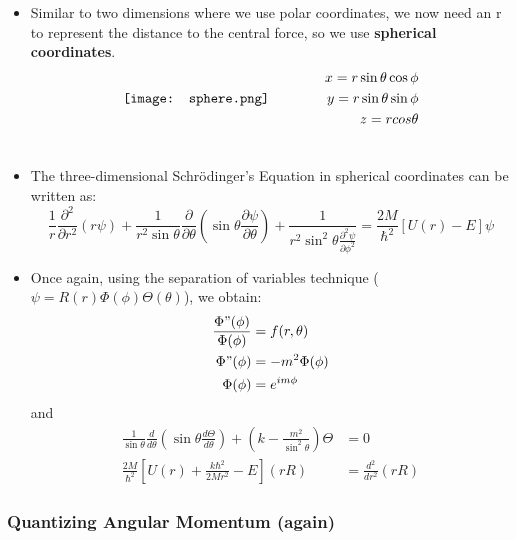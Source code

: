 \documentclass[12pt, letterpaper, twoside]{article}
\begin{document}
\begin{itemize}
    \item Similar to two dimensions where we use polar coordinates, we now need an r to represent the distance to the central force, so we use \textbf{spherical coordinates}.
    \begin{align}
        \vcenter{\hbox{\texttt{[image: sphere.png]}}}
        &\qquad\qquad
        \begin{aligned}
            x = r\sin{\theta}\cos{\phi} \\
            y = r\sin{\theta}\sin{\phi} \\
            z = rcos{\theta}
        \end{aligned}\\
        \vcenter{\hbox{\begin{minipage}{4cm}
        \end{minipage}}}
        & \notag
    \end{align}
    \item The three-dimensional Schr\"{o}dinger's Equation in spherical coordinates can be written as:
    \begin{equation}
        \frac{1}{r}\frac{\partial^2}{\partial r^2}(r\psi) + \frac{1}{r^2\sin{\theta}}\frac{\partial}{\partial\theta}(\sin{\theta}\frac{\partial\psi}{\partial\theta}) + \frac{1}{r^2\sin^2{\theta}\frac{\partial^2\psi}{\partial\phi^2}} = \frac{2M}{\hbar^2}[U(r) - E]\psi
    \end{equation}
    \item Once again, using the separation of variables technique ($\psi = R(r)\Phi(\phi)\Theta(\theta)$), we obtain:
    \begin{align*}
        \frac{\Phi"(\phi)}{\Phi(\phi)} &= f(r, \theta) \\
        \Phi"(\phi) &= -m^2\Phi(\phi) \\
        \Phi(\phi) &= e^{im\phi}
    \end{align*}
    and
    \begin{align*}
        \frac{1}{\sin\theta}\frac{d}{d\theta}(\sin\theta\frac{d\Theta}{d\theta}) + (k - \frac{m^2}{\sin^2\theta})\Theta &= 0 \\
        \frac{2M}{\hbar^2}[U(r) + \frac{k\hbar^2}{2Mr^2} - E](rR) &= \frac{d^2}{dr^2}(rR)
    \end{align*}
\end{itemize}

\subsubsection{Quantizing Angular Momentum (again)}
\end{document}
